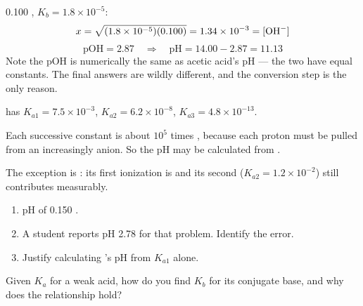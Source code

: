 \documentclass{apchem-notes}
\begin{document}
\begin{workedexample}
\SI{0.100}{\Molar} , $K_b = 1.8\times10^{-5}$:
\[ x = \sqrt{(1.8\times10^{-5})(0.100)} = 1.34\times10^{-3} = [\ce{OH-}] \]
\[ \mathrm{pOH} = 2.87 \quad\Longrightarrow\quad
   \mathrm{pH} = 14.00 - 2.87 = \mathbf{11.13} \]
Note the pOH is numerically the same as acetic acid's pH --- the two have
equal constants. The final answers are wildly different, and the conversion
step is the only reason.
\end{workedexample}



 has $K_{a1} = 7.5\times10^{-3}$,
$K_{a2} = 6.2\times10^{-8}$, $K_{a3} = 4.8\times10^{-13}$.

Each successive constant is about $10^5$ times
, because each proton must be pulled from an
increasingly  anion. So the pH may be
calculated from .

The exception is : its first ionization is
 and its second
($K_{a2} = 1.2\times10^{-2}$) still contributes measurably.


\begin{enumerate}[leftmargin=*,itemsep=0.4em]
  \item pH of \SI{0.150}{\Molar} . \workspace[2.4cm]
  \item A student reports pH 2.78 for that problem. Identify the error.
  \item Justify calculating 's pH from $K_{a1}$ alone.
\end{enumerate}

\begin{exitticket}
Given $K_a$ for a weak acid, how do you find $K_b$ for its conjugate base,
and why does the relationship hold?
\end{exitticket}
\end{document}
